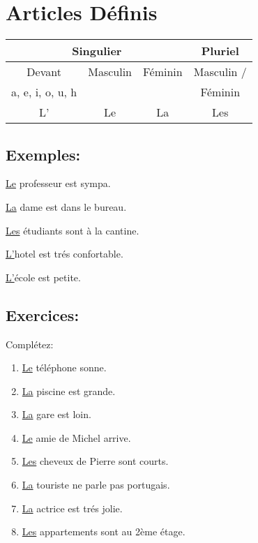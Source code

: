 \section{Articles Définis}

\begin{center}
    \begin{tabular}{|c|c|c|c|}
        \hline
        \multicolumn{3}{|c|}{Singulier} & Pluriel \\
        \hline
        Devant & Masculin & Féminin & Masculin / \\
        a, e, i, o, u, h & \ & \ & Féminin \\
        \hline 
        L' & Le & La & Les \\
        \hline
    \end{tabular}
\end{center}

\subsection{Exemples:}

\underline{Le} professeur est sympa.

\underline{La} dame est dans le bureau.

\underline{Les} étudiants sont à la cantine.

\underline{L'}hotel est trés confortable.

\underline{L'}école est petite.

\subsection{Exercices:}

Complétez:

\begin{enumerate}
    \item \underline{Le} téléphone sonne.
    \item \underline{La} piscine est grande.
    \item \underline{La} gare est loin.
    \item \underline{Le} amie de Michel arrive.
    \item \underline{Les} cheveux de Pierre sont courts.
    \item \underline{La} touriste ne parle pas portugais.
    \item \underline{La} actrice est trés jolie.
    \item \underline{Les} appartements sont au 2ème étage.
\end{enumerate}
